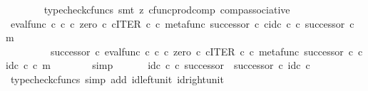 \begin{isabellebody}
\ \ \ \ \ \ \isamarkupfalse%
\ {\isacharparenleft}{\kern0pt}typecheck{\isacharunderscore}{\kern0pt}cfuncs{\isacharcomma}{\kern0pt}\ smt\ {\isacharparenleft}{\kern0pt}z{}{\isacharparenright}{\kern0pt}\ cfunc{\isacharunderscore}{\kern0pt}prod{\isacharunderscore}{\kern0pt}comp\ comp{\isacharunderscore}{\kern0pt}associative{}{\isacharparenright}{\kern0pt}\isanewline
\ \ \ \ \isamarkupfalse%
\ \isamarkupfalse%
\ {\isachardoublequoteopen}{\isacharparenleft}{\kern0pt}{\isacharparenleft}{\kern0pt}eval{\isacharunderscore}{\kern0pt}func\ {\isasymnat}\isactrlsub c\ {\isasymnat}\isactrlsub c\ {\isasymcirc}\isactrlsub c\ {\isasymlangle}zero\ {\isasymcirc}\isactrlsub c\ {\isasymbeta}\isactrlbsub {\isasymnat}\isactrlsub c\isactrlesub {\isacharcomma}{\kern0pt}ITER\ {\isasymnat}\isactrlsub c\ {\isasymcirc}\isactrlsub c\ {\isasymlangle}metafunc\ successor\ {\isasymcirc}\isactrlsub c\ {\isasymbeta}\isactrlbsub {\isasymnat}\isactrlsub c\isactrlesub {\isacharcomma}{\kern0pt}id\isactrlsub c\ {\isasymnat}\isactrlsub c{\isasymrangle}{\isasymrangle}{\isacharparenright}{\kern0pt}\ {\isasymcirc}\isactrlsub c\ successor{\isacharparenright}{\kern0pt}\ {\isasymcirc}\isactrlsub c\ m\ {\isacharequal}{\kern0pt}\isanewline
\ \ \ \ \ \ \ \ \ {\isacharparenleft}{\kern0pt}successor\ {\isasymcirc}\isactrlsub c\ eval{\isacharunderscore}{\kern0pt}func\ {\isasymnat}\isactrlsub c\ {\isasymnat}\isactrlsub c\ {\isasymcirc}\isactrlsub c\ {\isasymlangle}zero\ {\isasymcirc}\isactrlsub c\ {\isasymbeta}\isactrlbsub {\isasymnat}\isactrlsub c\isactrlesub {\isacharcomma}{\kern0pt}ITER\ {\isasymnat}\isactrlsub c\ {\isasymcirc}\isactrlsub c\ {\isasymlangle}metafunc\ successor\ {\isasymcirc}\isactrlsub c\ {\isasymbeta}\isactrlbsub {\isasymnat}\isactrlsub c\isactrlesub {\isacharcomma}{\kern0pt}id\isactrlsub c\ {\isasymnat}\isactrlsub c{\isasymrangle}{\isasymrangle}{\isacharparenright}{\kern0pt}\ {\isasymcirc}\isactrlsub c\ m{\isachardoublequoteclose}\isanewline
\ \ \ \ \ \ \isamarkupfalse%
\ simp\isanewline
\ \ \isamarkupfalse%
\isanewline
\ \ \isamarkupfalse%
\ {\isachardoublequoteopen}id\isactrlsub c\ {\isasymnat}\isactrlsub c\ {\isasymcirc}\isactrlsub c\ successor\ {\isacharequal}{\kern0pt}\ successor\ {\isasymcirc}\isactrlsub c\ id\isactrlsub c\ {\isasymnat}\isactrlsub c{\isachardoublequoteclose}\isanewline
\ \ \ \ \isamarkupfalse%
\ {\isacharparenleft}{\kern0pt}typecheck{\isacharunderscore}{\kern0pt}cfuncs{\isacharcomma}{\kern0pt}\ simp\ add{\isacharcolon}{\kern0pt}\ id{\isacharunderscore}{\kern0pt}left{\isacharunderscore}{\kern0pt}unit{}\ id{\isacharunderscore}{\kern0pt}right{\isacharunderscore}{\kern0pt}unit{}{\isacharparenright}{\kern0pt}\isanewline

\end{isabellebody}
